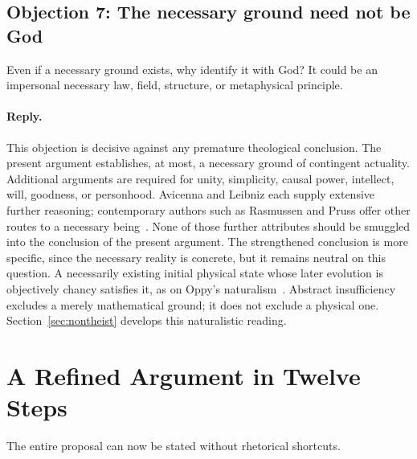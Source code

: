 \documentclass[11pt,letterpaper]{article}
\theoremstyle{plain}
\theoremstyle{definition}
\begin{document}
\subsection{Objection 7: The necessary ground need not be God}
\label{obj:god}

Even if a necessary ground exists, why identify it with God? It could be an impersonal necessary law, field, structure, or metaphysical principle.

\paragraph{Reply.} This objection is decisive against any premature theological conclusion. The present argument establishes, at most, a necessary ground of contingent actuality. Additional arguments are required for unity, simplicity, causal power, intellect, will, goodness, or personhood. Avicenna and Leibniz each supply extensive further reasoning; contemporary authors such as Rasmussen and Pruss offer other routes to a necessary being~\cite{rasmussen,pruss}. None of those further attributes should be smuggled into the conclusion of the present argument. The strengthened conclusion is more specific, since the necessary reality is concrete, but it remains neutral on this question. A necessarily existing initial physical state whose later evolution is objectively chancy satisfies it, as on Oppy's naturalism~\cite{oppy13}. Abstract insufficiency excludes a merely mathematical ground; it does not exclude a physical one. Section~\ref{sec:nontheist} develops this naturalistic reading.

\section{A Refined Argument in Twelve Steps}
\label{sec:steps}

The entire proposal can now be stated without rhetorical shortcuts.
\end{document}
